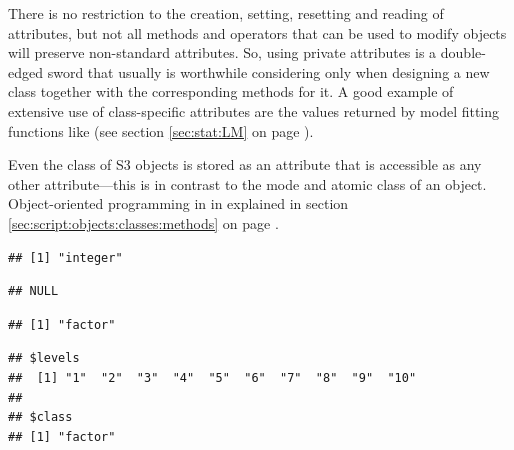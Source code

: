 \documentclass[krantz2]{krantz}\usepackage{knitr}
\begin{document}
\begin{warningbox}
There is no restriction to the creation, setting, resetting and reading of attributes, but not all methods and operators that can be used to modify objects will preserve non-standard attributes. So, using private attributes is a double-edged sword that usually is worthwhile considering only when designing a new class together with the corresponding methods for it. A good example of extensive use of class-specific attributes are the values returned by model fitting functions like  (see section \ref{sec:stat:LM} on page \pageref{sec:stat:LM}).

Even the class of S3 objects is stored as an attribute that is accessible as any other attribute---this is in contrast to the mode and atomic class of an object. Object-oriented programming in \Rlang in explained in section \ref{sec:script:objects:classes:methods} on page \pageref{sec:script:objects:classes:methods}.

\begin{knitrout}\footnotesize
{}\color{fgcolor}\begin{kframe}
\begin{alltt}
 \hlkwb{<-} \hlopt{:}
\end{alltt}
\begin{verbatim}
## [1] "integer"
\end{verbatim}
\begin{alltt}
\end{alltt}
\begin{verbatim}
## NULL
\end{verbatim}
\end{kframe}
\end{knitrout}

\begin{knitrout}\footnotesize
{}\color{fgcolor}\begin{kframe}
\begin{alltt}
 \hlkwb{<-} 
\end{alltt}
\begin{verbatim}
## [1] "factor"
\end{verbatim}
\begin{alltt}
\end{alltt}
\begin{verbatim}
## $levels
##  [1] "1"  "2"  "3"  "4"  "5"  "6"  "7"  "8"  "9"  "10"
##
## $class
## [1] "factor"
\end{verbatim}
\end{kframe}
\end{knitrout}
\end{warningbox}
\end{document}
